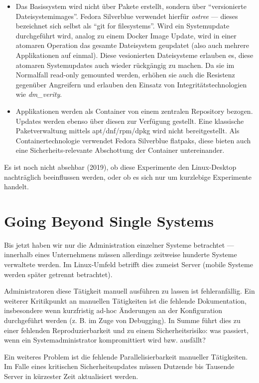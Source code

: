 \begin{itemize}
	\item Das Basissystem wird nicht über Pakete erstellt, sondern über ``versionierte Dateisystemimages''. Fedora Silverblue verwendet hierfür \textit{ostree} --- dieses bezeichnet sich selbst als ``git for filesystems''. Wird ein Systemupdate durchgeführt wird, analog zu einem Docker Image Update, wird in einer atomaren Operation das gesamte Dateisystem geupdatet (also auch mehrere Applikationen auf einmal). Diese vesionierten Dateisysteme erlauben es, diese atomaren Systemupdates auch wieder rückgängig zu machen. Da sie im Normalfall read-only gemounted werden, erhöhen sie auch die Resistenz gegenüber Angreifern und erlauben den Einsatz von Integritätstechnologien wie \textit{dm\_verity}.
	\item Applikationen werden als Container von einem zentralen Repository bezogen. Updates werden ebenso über diesen zur Verfügung gestellt. Eine klassische Paketverwaltung mittels apt/dnf/rpm/dpkg wird nicht bereitgestellt. Als Containertechnologie verwendet Fedora Silverblue flatpaks, diese bieten auch eine Sicherheits-relevante Abschottung der Container untereinander.
\end{itemize}

Es ist noch nicht absehbar (2019), ob diese Experimente den Linux-Desktop nachträglich beeinflussen werden, oder ob es sich nur um kurzlebige Experimente handelt.

\section{Going Beyond Single Systems}

Bis jetzt haben wir nur die Administration einzelner Systeme betrachtet --- innerhalb eines Unternehmens müssen allerdings zeitweise hunderte Systeme verwaltete werden. Im Linux-Umfeld betrifft dies zumeist Server (mobile Systeme werden später getrennt betrachtet).

Administratoren diese Tätigkeit manuell ausführen zu lassen ist fehleranfällig. Ein weiterer Kritikpunkt an manuellen Tätigkeiten ist die fehlende Dokumentation, insbesondere wenn kurzfristig ad-hoc Änderungen an der Konfiguration durchgeführt werden (z. B. im Zuge von Debugging). In Summe führt dies zu einer fehlenden Reproduzierbarkeit und zu einem Sicherheitsrisiko: was passiert, wenn ein Systemadministrator kompromittiert wird bzw. ausfällt?

Ein weiteres Problem ist die fehlende Parallelisierbarkeit manueller Tätigkeiten. Im Falle eines kritischen Sicherheitsupdates müssen Dutzende bis Tausende Server in kürzester Zeit aktualisiert werden.

